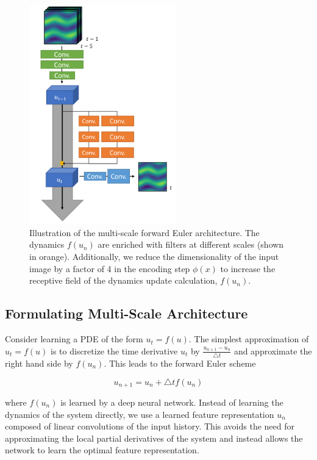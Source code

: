 \documentclass[12pt]{article}
\theoremstyle{plain}
\theoremstyle{remark}
\theoremstyle{definition}
\begin{document}
\begin{figure}
\begin{minipage}[c]{0.49\textwidth}
	\end{minipage}
	\begin{minipage}[c]{0.49\textwidth}
		\centering
		\includegraphics[width=2.5in]{pde_arch_multi}
		\caption{Illustration of the multi-scale forward Euler architecture. The
		dynamics $f(u_n)$ are enriched with filters at different scales (shown in orange). Additionally, we reduce the dimensionality of the input image by a factor of 4 in the encoding step $\phi(x)$ to increase the receptive field of the dynamics update calculation, $f(u_n)$. }
		\label{fig:arch}
	\end{minipage}
\end{figure}



\subsection{Formulating Multi-Scale Architecture}

Consider learning a PDE of the form $u_t = f(u)$. The simplest approximation of $u_t = f(u)$ is to discretize the time derivative $u_t$ by $\frac{u_{n+1} - u_n}{\bigtriangleup t}$ and approximate the right hand side by $f(u_n)$. This leads to the forward Euler scheme  

$$u_{n+1} = u_n + \bigtriangleup t f(u_n) \label{eqn:ode} $$

where $f(u_n)$ is learned by a deep neural network. Instead of learning the dynamics of the system directly, we use a learned feature representation $u_n$ composed of linear convolutions of the input history. This avoids the need for approximating the local partial derivatives of the system and instead allows the network to learn the optimal feature representation.
\end{document}

